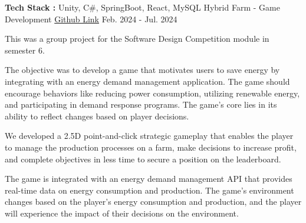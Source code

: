 \begin{cventries}

\cventry
{\textbf{Tech Stack :} Unity, C\#, SpringBoot, React, MySQL} %
{Hybrid Farm - Game Development} %
{\href{https://github.com/Stealth-Devs-Org/Stealth-SDC-Sem6}{Github Link}} %
{Feb. 2024 - Jul. 2024} %
{ %
\begin{cvitems}
\item {This was a group project for the Software Design Competition module in semester 6.}
\item {The objective was to develop a game that motivates users to save energy by integrating with an energy demand management application. The game should encourage behaviors like reducing power consumption, utilizing renewable energy, and participating in demand response programs. The game's core lies in its ability to reflect changes based on player decisions.}
\item {We developed a 2.5D point-and-click strategic gameplay that enables the player to manage the production processes on a farm, make decisions to increase profit, and complete objectives in less time to secure a position on the leaderboard.}
\item {The game is integrated with an energy demand management API that provides real-time data on energy consumption and production. The game's environment changes based on the player's energy consumption and production, and the player will experience the impact of their decisions on the environment.}
\end{cvitems}
}



\end{cventries}
